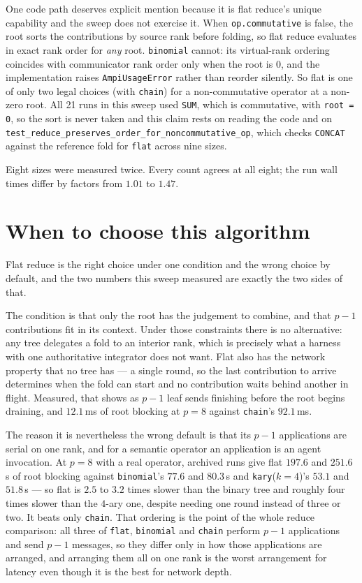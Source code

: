 \documentclass[11pt]{article}
\begin{document}
One code path deserves explicit mention because it is flat reduce's unique capability and the
sweep does not exercise it. When \texttt{op.commutative} is false, the root sorts the
contributions by source rank before folding, so flat reduce evaluates in exact rank order for
\emph{any} root. \texttt{binomial} cannot: its virtual-rank ordering coincides with
communicator rank order only when the root is $0$, and the implementation raises
\texttt{AmpiUsageError} rather than reorder silently. So flat is one of only two legal choices
(with \texttt{chain}) for a non-commutative operator at a non-zero root. All 21 runs in this
sweep used \texttt{SUM}, which is commutative, with \texttt{root = 0}, so the sort is never
taken and this claim rests on reading the code and on
\texttt{test\_reduce\_preserves\_order\_for\_noncommutative\_op}, which checks \texttt{CONCAT}
against the reference fold for \texttt{flat} across nine sizes.

Eight sizes were measured twice. Every count agrees at all eight; the run wall times differ by
factors from $1.01$ to $1.47$.

\section{When to choose this algorithm}

Flat reduce is the right choice under one condition and the wrong choice by default, and the
two numbers this sweep measured are exactly the two sides of that.

The condition is that only the root has the judgement to combine, and that $p-1$ contributions
fit in its context. Under those constraints there is no alternative: any tree delegates a fold
to an interior rank, which is precisely what a harness with one authoritative integrator does
not want. Flat also has the network property that no tree has --- a single round, so the last
contribution to arrive determines when the fold can start and no contribution waits behind
another in flight. Measured, that shows as $p-1$ leaf sends finishing before the root begins
draining, and $12.1$\,ms of root blocking at $p=8$ against \texttt{chain}'s $92.1$\,ms.

The reason it is nevertheless the wrong default is that its $p-1$ applications are serial on
one rank, and for a semantic operator an application is an agent invocation. At $p=8$ with a
real operator, archived runs give flat $197.6$ and $251.6$\,s of root blocking against
\texttt{binomial}'s $77.6$ and $80.3$\,s and \texttt{kary}($k{=}4$)'s $53.1$ and $51.8$\,s ---
so flat is $2.5$ to $3.2$ times slower than the binary tree and roughly four times slower than
the $4$-ary one, despite needing one round instead of three or two. It beats only
\texttt{chain}. That ordering is the point of the whole reduce comparison: all three of
\texttt{flat}, \texttt{binomial} and \texttt{chain} perform $p-1$ applications and send $p-1$
messages, so they differ only in how those applications are arranged, and arranging them all on
one rank is the worst arrangement for latency even though it is the best for network depth.
\end{document}
